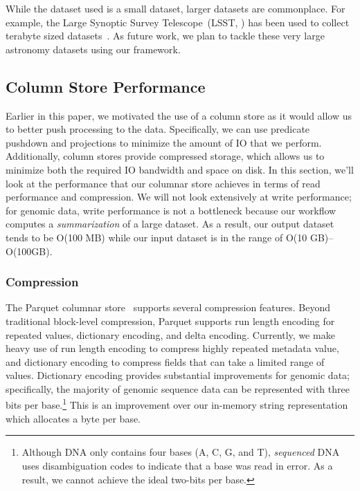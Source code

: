 \documentclass{acm_proc_article-sp}
\begin{document}
While the dataset used is a small dataset, larger datasets are commonplace. For example, the Large Synoptic
Survey Telescope~(LSST, \cite{lsst2008}) has been used to collect terabyte sized datasets~\cite{moyers13}. As
future work, we plan to tackle these very large astronomy datasets using our framework.

\subsection{Column Store Performance}
\label{sec:column-store-perf}

Earlier in this paper, we motivated the use of a column store as it would allow us to better push processing to
the data. Specifically, we can use predicate pushdown and projections to minimize the amount of IO that we
perform. Additionally, column stores provide compressed storage, which allows us to minimize both the required
IO bandwidth and space on disk. In this section, we'll look at the performance that our columnar store achieves
in terms of read performance and compression. We will not look extensively at write performance; for genomic
data, write performance is not a bottleneck because our workflow computes a \emph{summarization} of a large
dataset. As a result, our output dataset tends to be O(100 MB) while our input dataset is in the range of
O(10 GB)--O(100GB).

\subsubsection{Compression}
\label{sec:compression}

The Parquet columnar store~\cite{parquet} supports several compression features. Beyond traditional block-level
compression, Parquet supports run length encoding for repeated values, dictionary encoding, and delta
encoding. Currently, we make heavy use of run length encoding to compress highly repeated metadata value,
and dictionary encoding to compress fields that can take a limited range of values. Dictionary encoding provides
substantial improvements for genomic data; specifically, the majority of genomic sequence data can be
represented with three bits per base.\footnote{Although DNA only contains four bases (A, C, G, and T),
\emph{sequenced} DNA uses disambiguation codes to indicate that a base was read in error. As a result, we
cannot achieve the ideal two-bits per base.} This is an improvement over our in-memory string representation
which allocates a byte per base.
\end{document}
